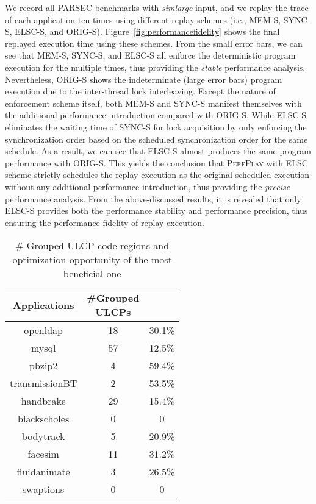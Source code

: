We record all PARSEC benchmarks with \emph{simlarge} input, and we replay the trace of each application ten times using different replay schemes (i.e., MEM-S, SYNC-S, ELSC-S, and ORIG-S). Figure~\ref{fig:performancefidelity} shows the final replayed execution time using these schemes. {From the small error bars, we can see that MEM-S, SYNC-S, and ELSC-S all enforce the deterministic program execution for the multiple times}, thus providing the \emph{stable} performance analysis. Nevertheless, ORIG-S shows the indeterminate {(large error bars)} program execution due to the inter-thread lock interleaving. Except the nature of enforcement scheme itself, both MEM-S and SYNC-S manifest themselves with the additional performance introduction compared with ORIG-S. While ELSC-S eliminates the waiting time of SYNC-S for lock acquisition by only enforcing the synchronization order based on the scheduled synchronization order for the same schedule. As a result, we can see that ELSC-S almost produces the same program performance with ORIG-S. This yields the conclusion that \textsc{PerfPlay} with ELSC scheme strictly schedules the replay execution as the original scheduled execution without any additional performance introduction, thus providing the \emph{precise} performance analysis. {From the above-discussed results, it is revealed that only ELSC-S provides both the performance stability and performance precision, thus ensuring the performance fidelity of replay execution.}


\begin{table}[tbp]   \caption{\# Grouped ULCP code regions and optimization opportunity of the most beneficial one}
\small
\tabcolsep=0.1cm
\setlength{\abovecaptionskip}{10pt}
\setlength{\belowcaptionskip}{-10pt}
\centering
\begin{tabular}{|c|c|c|}\hline
\textbf{Applications}& \minitab[c]{\#Grouped\\ULCPs}& \textbf{} \\ \hline \hline
{\sf openldap}&18 &30.1\%  \\
{\sf mysql}&57 &12.5\%  \\\hline
{\sf pbzip2}&4 &59.4\%  \\
{\sf transmissionBT}&2 &53.5\% \\
{\sf handbrake}&29 &15.4\%  \\ \hline
{\sf blackscholes}&0 &0  \\
{\sf bodytrack}&5 &20.9\%  \\
{\sf facesim}&11 & 31.2\% \\
{\sf fluidanimate}&3 &26.5\%  \\
{\sf swaptions}&0 &0  \\ \hline
\end{tabular}
\label{table:region}
\end{table}
